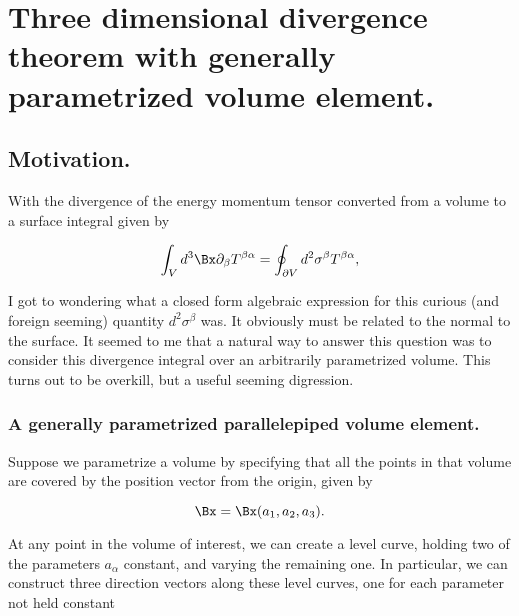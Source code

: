 
%

\chapter{Three dimensional divergence theorem with generally parametrized volume element.}
\label{chap:divergence3Dtensor}
{}
\date{April 10, 2011}

\beginArtWithToc

\section{Motivation.}

With the divergence of the energy momentum tensor converted from a volume to a surface integral given by

\begin{equation}\label{eqn:relativisticElectrodynamicsPS6:340}
\int_V d^3 \Bx \partial_\beta T^{\beta \alpha} = \oint_{\partial V} d^2 \sigma^\beta T^{\beta \alpha},
\end{equation}

I got to wondering what a closed form algebraic expression for this curious (and foreign seeming) quantity $d^2 \sigma^\beta$ was.  It obviously must be related to the normal to the surface.  It seemed to me that a natural way to answer this question was to consider this divergence integral over an arbitrarily parametrized volume.  This turns out to be overkill, but a useful seeming digression.

\subsection{A generally parametrized parallelepiped volume element.}

Suppose we parametrize a volume by specifying that all the points in that volume are covered by the position vector from the origin, given by

\begin{equation}\label{eqn:relativisticElectrodynamicsPS6:360}
\Bx = \Bx(a_1, a_2, a_3).
\end{equation}

At any point in the volume of interest, we can create a level curve, holding two of the parameters $a_\alpha$ constant, and varying the remaining one.  In particular, we can construct three direction vectors along these level curves, one for each parameter not held constant

